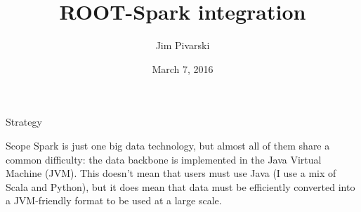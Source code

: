 \documentclass{beamer}
\title[2016-03-07-spark]{ROOT-Spark integration}
\author{Jim Pivarski}
\institute{Princeton Univeristy --- DIANA}
\date{March 7, 2016}
\begin{document}
\begin{frame}
  \titlepage
\end{frame}


\begin{frame}{Strategy}
\begin{block}{Scope}
Spark is just one big data technology, but almost all of them share a common difficulty: the data backbone is implemented in the Java Virtual Machine (JVM). This doesn't mean that users must use Java (I use a mix of Scala and Python), but it does mean that data must be efficiently converted into a JVM-friendly format to be used at a large scale.
\end{block}




\end{frame}
\end{document}
